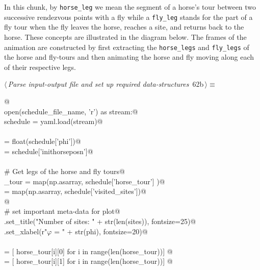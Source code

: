 \documentclass[11.5pt]{report}
\begin{document}
\vspace{-0.8cm} \newchunk In this chunk, by \verb|horse_leg| we mean the segment of a horse's 
tour between two successive rendezvous points with a fly while a \verb|fly_leg| stands for 
the part of a fly tour when the fly leaves the horse, reaches a site, and returns back to the horse. These
concepts are illustrated in the diagram below. The frames of the animation are constructed by first
extracting the \verb|horse_legs| and \verb|fly_legs| of the horse and fly-tours and then 
animating the horse and fly moving along each of their respective legs. 


\begin{flushleft} \small\label{scrap94}\raggedright\small
{} $\langle\,${\itshape Parse input-output file and set up required data-structures}\nobreak\ {\footnotesize {62b}}$\,\rangle\equiv$
\vspace{-1ex}
\begin{list}{}{} \item
\mbox{}\verb@   @\\
\mbox{}\verb@with open(schedule_file_name, 'r') as stream:@\\
\mbox{}\verb@      schedule = yaml.load(stream)@\\
\mbox{}\verb@@\\
\mbox{}\verb@phi           = float(schedule['phi'])@\\
\mbox{}\verb@inithorseposn = schedule['inithorseposn']@\\
\mbox{}\verb@@\\
\mbox{}\verb@# Get legs of the horse and fly tours@\\
\mbox{}\verb@horse_tour  = map(np.asarray, schedule['horse_tour']   )@\\
\mbox{}\verb@sites       = map(np.asarray, schedule['visited_sites'])@\\
\mbox{}\verb@           @\\
\mbox{}\verb@# set important meta-data for plot@\\
\mbox{}\verb@ax.set_title("Number of sites: " + str(len(sites)), fontsize=25)@\\
\mbox{}\verb@ax.set_xlabel(r"$\varphi$ = " + str(phi), fontsize=20)@\\
\mbox{}\verb@@\\
\mbox{}\verb@xhs = [ horse_tour[i][0] for i in range(len(horse_tour))]    @\\
\mbox{}\verb@yhs = [ horse_tour[i][1] for i in range(len(horse_tour))]    @\\

\end{list}
\end{flushleft}
\end{document}
